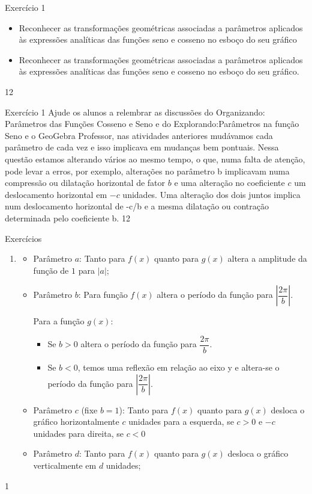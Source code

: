 \def\currentcolor{cor1}
\begin{objectives}{Exercício 1}
{
\begin{itemize}
\item Reconhecer as transformações geométricas associadas a parâmetros aplicados às expressões analíticas das funções seno e cosseno no esboço do seu gráfico
\end{itemize}

\begin{itemize}
\item Reconhecer as transformações geométricas associadas a
parâmetros aplicados às expressões analíticas das funções
seno e cosseno no esboço do seu gráfico.
\end{itemize}
}{1}{2}
\end{objectives}
\marginpar{\vspace{-2.5em}}
\begin{sugestions}{Exercício 1}
{
Ajude os alunos a relembrar as discussões do Organizando: Parâmetros das Funções Cosseno e Seno e do Explorando:Parâmetros na função Seno e o GeoGebra
Professor, nas atividades anteriores mudávamos cada parâmetro de cada vez e isso implicava em mudanças bem pontuais. Nessa questão estamos alterando vários ao mesmo tempo, o que, numa falta de atenção, pode levar a erros, por exemplo, alterações no parâmetro b implicavam numa compressão ou dilatação horizontal de fator $b$ e uma alteração no coeficiente $c$ um deslocamento horizontal em $-c$ unidades. Uma alteração dos dois juntos implica num deslocamento horizontal de -c/b e a mesma dilatação ou contração determinada pelo coeficiente b.
}{1}{2}
\end{sugestions}
\marginpar{\vspace{-1.5em}}
\begin{answer}{Exercícios}
{\exerciselist\small
\begin{enumerate}
\item 
\begin{itemize}
\item Parâmetro $a$: Tanto para $f(x)$ quanto para $g(x)$ altera a amplitude da função de $1$ para $|a|$;
\item Parâmetro $b$: Para função $f(x)$ altera o período da função para $|\dfrac{2\pi}{b}|$. 

Para a função $g(x)$:
\begin{itemize}
\item Se $b>0$ altera o período da função para $\dfrac{2\pi}{b}$. 
\item Se $b<0$, temos uma reflexão em relação ao eixo y e altera-se o período da função para $|\dfrac{2\pi}{b}|$.
\end{itemize}
\item Parâmetro $c$ (fixe $b=1$): Tanto para $f(x)$ quanto para $g(x)$ desloca o gráfico horizontalmente $c$ unidades para a esquerda, se $c>0$ e $-c$ unidades para direita, se $c<0$
\item Parâmetro $d$: Tanto para $f(x)$ quanto para $g(x)$ desloca o
gráfico verticalmente em $d$ unidades;
\end{itemize}
\end{enumerate}
}{1}
\end{answer}
